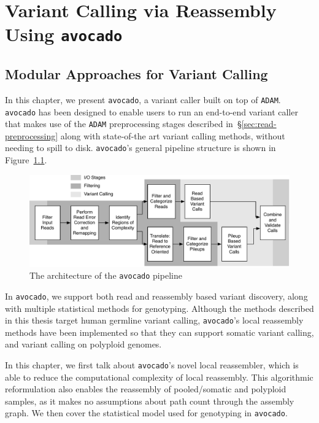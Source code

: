 \documentclass[masters]{ucbthesis}
\begin{document}
\chapter{Variant Calling via Reassembly Using \texttt{avocado}}

\section{Modular Approaches for Variant Calling}
\label{sec:variant-calling}

In this chapter, we present \texttt{avocado}, a variant caller built on top of \texttt{ADAM}. \texttt{avocado} has
been designed to enable users to run an end-to-end variant caller that makes use of the \texttt{ADAM}
preprocessing stages described in~\S\ref{sec:read-preprocessing} along with state-of-the art variant calling
methods, without needing to spill to disk. \texttt{avocado}'s general pipeline structure is shown in
Figure~\ref{fig:avocado-architecture}.

\begin{figure}[h]
\begin{center}
\includegraphics[width=0.8\linewidth]{avocado-architecture.pdf}
\end{center}
\caption{The architecture of the \texttt{avocado} pipeline}
\label{fig:avocado-architecture}
\end{figure}

In \texttt{avocado}, we support both read and reassembly based variant discovery, along with multiple statistical
methods for genotyping. Although the methods described in this thesis target human germline variant calling,
\texttt{avocado}'s local reassembly methods have been implemented so that they can support somatic variant
calling, and variant calling on polyploid genomes.

In this chapter, we first talk about \texttt{avocado}'s novel local reassembler, which is able to reduce the computational
complexity of local reassembly. This algorithmic reformulation also enables the reassembly of pooled/somatic and
polyploid samples, as it makes no assumptions about path count through the assembly graph. We then cover the
statistical model used for genotyping in \texttt{avocado}.
\end{document}
